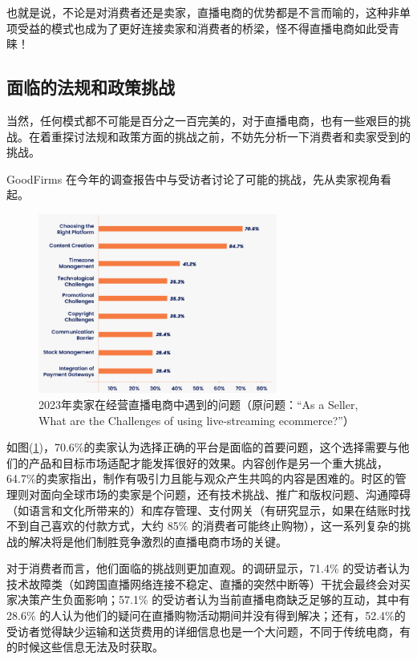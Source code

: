 \documentclass[12pt]{ctexart}
\begin{document}
也就是说，不论是对消费者还是卖家，直播电商的优势都是不言而喻的，这种非单项受益的模式也成为了更好连接卖家和消费者的桥梁，怪不得直播电商如此受青睐！



\subsection{面临的法规和政策挑战}
当然，任何模式都不可能是百分之一百完美的，对于直播电商，也有一些艰巨的挑战。在着重探讨法规和政策方面的挑战之前，不妨先分析一下消费者和卖家受到的挑战。

GoodFirms 在今年的调查报告\cite{24}中与受访者讨论了可能的挑战，先从卖家视角看起。

\begin{figure}[htbp!]
    \centering
    \includegraphics[width=0.7\textwidth]{Images/21.png}
    \caption{2023年卖家在经营直播电商中遇到的问题（原问题：“As a Seller, What are the Challenges of using live-streaming ecommerce?”） \cite{24}}
    \label{challenge}
\end{figure}

如图(\ref{challenge})，70.6\%的卖家认为选择正确的平台是面临的首要问题，这个选择需要与他们的产品和目标市场适配才能发挥很好的效果。内容创作是另一个重大挑战，64.7\%的卖家指出，制作有吸引力且能与观众产生共鸣的内容是困难的。时区的管理则对面向全球市场的卖家是个问题，还有技术挑战、推广和版权问题、沟通障碍（如语言和文化所带来的）和库存管理、支付网关（有研究显示，如果在结账时找不到自己喜欢的付款方式，大约 85\% 的消费者可能终止购物\cite{24}），这一系列复杂的挑战的解决将是他们制胜竞争激烈的直播电商市场的关键。

对于消费者而言，他们面临的挑战则更加直观。\cite{24}的调研显示，71.4\% 的受访者认为技术故障类（如跨国直播网络连接不稳定、直播的突然中断等）干扰会最终会对买家决策产生负面影响；57.1\% 的受访者认为当前直播电商缺乏足够的互动，其中有28.6\% 的人认为他们的疑问在直播购物活动期间并没有得到解决；还有，52.4\%的受访者觉得缺少运输和送货费用的详细信息也是一个大问题，不同于传统电商，有的时候这些信息无法及时获取。
\end{document}
